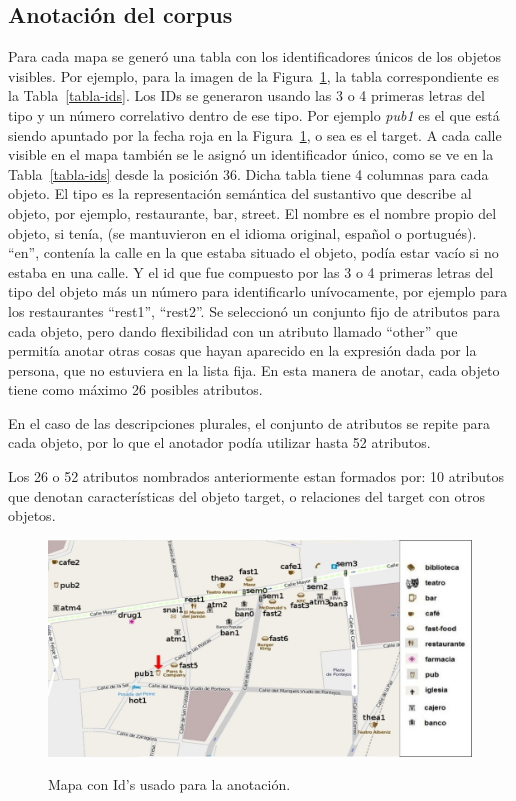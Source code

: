 \subsection{Anotaci\'on del corpus}
\label{corpus-anotacion}

Para cada mapa se gener\'o una tabla con los identificadores \'unicos de los objetos visibles. Por ejemplo, para la imagen de la Figura~\ref{mapa-con-ids}, la tabla correspondiente es la Tabla~\ref{tabla-ids}. Los IDs se generaron usando las 3 o 4 primeras letras del tipo y un n\'umero correlativo dentro de ese tipo. Por ejemplo {\it pub1} es el que est\'a siendo apuntado por la fecha roja en la Figura~\ref{mapa-con-ids}, o sea es el target. A cada calle visible en el mapa tambi\'en se le asign\'o un identificador \'unico, como se ve en la Tabla~\ref{tabla-ids} desde la posici\'on  36. Dicha tabla tiene 4 columnas para cada objeto. El tipo es la representaci\'on sem\'antica del sustantivo que describe al objeto, por ejemplo, restaurante, bar, street. El nombre es el nombre propio del objeto, si ten\'ia, (se mantuvieron en el idioma original, espa\~nol o portugu\'es). ``en'', conten\'ia la calle en la que estaba situado el objeto, pod\'ia estar vac\'io si no estaba en una calle. Y el id que  fue compuesto por las 3 o 4 primeras letras del tipo del objeto m\'as un n\'umero para identificarlo un\'ivocamente, por ejemplo para los restaurantes ``rest1'', ``rest2''.
Se seleccion\'o un conjunto fijo de atributos para cada objeto, pero dando flexibilidad con un atributo llamado ``other'' que permit\'ia anotar otras cosas que hayan aparecido en la expresi\'on dada por la persona, que no estuviera en la lista fija. En esta manera de anotar, cada objeto tiene como m\'aximo 26 posibles atributos.

En el caso de las descripciones plurales, el conjunto de atributos se repite para cada objeto, por lo que el anotador pod\'{i}a utilizar hasta 52 atributos.

Los 26 o 52 atributos nombrados anteriormente estan formados por:
10 atributos que denotan caracter\'isticas del objeto target, o relaciones del target con otros objetos.

\begin{figure}[H]
\centering
\includegraphics[width=\textwidth]{figures/ids.png}\\[0pt]
\caption{Mapa con Id's usado para la anotaci\'on.}
\label{mapa-con-ids}
\end{figure}

